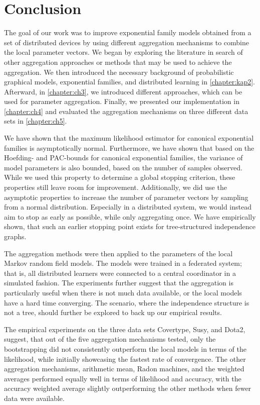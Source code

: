 
\chapter{Conclusion}
\label{chapter:ch6}
The goal of our work was to improve exponential family models obtained from a set of distributed devices by using different aggregation mechanisms to combine the local parameter vectors.
We began by exploring the literature in search of other aggregation approaches or methods that may be used to achieve the aggregation.
We then introduced the necessary background of probabilistic graphical models, exponential families, and distributed learning in \autoref{chapter:kap2}.
Afterward, in \autoref{chapter:ch3}, we introduced different approaches, which can be used for parameter aggregation.
Finally, we presented our implementation in \autoref{chapter:ch4} and evaluated the aggregation mechanisms on three different data sets in \autoref{chapter:ch5}.

We have shown that the maximum likelihood estimator for canonical exponential families is asymptotically normal.
Furthermore, we have shown that based on the Hoefding- and PAC-bounds for canonical exponential families, the variance of model parameters is also bounded, based on the number of samples observed.
While we used this property to determine a global stopping criterion, these properties still leave room for improvement.
Additionally, we did use the asymptotic properties to increase the number of parameter vectors by sampling from a normal distribution.
Especially in a distributed system, we would instead aim to stop as early as possible, while only aggregating once.
We have empirically shown, that such an earlier stopping point exists for tree-structured independence graphs.

The aggregation methods were then applied to the parameters of the local Markov random field models.
The models were trained in a federated system; that is, all distributed learners were connected to a central coordinator in a simulated fashion.
The experiments further suggest that the aggregation is particularly useful when there is not much data available, or the local models have a hard time converging.
The scenario, where the independence structure is not a tree, should further be explored to back up our empirical results.

The empirical experiments on the three data sets Covertype, Susy, and Dota2, suggest, that out of the five aggregation mechanisms tested, only the bootstrapping did not consistently outperform the local models in terms of the likelihood, while initially showcasing the fastest rate of convergence.
The other aggregation mechanisms, arithmetic mean, Radon machines, and the weighted averages performed equally well in terms of likelihood and accuracy, with the accuracy weighted average slightly outperforming the other methods when fewer data were available.


